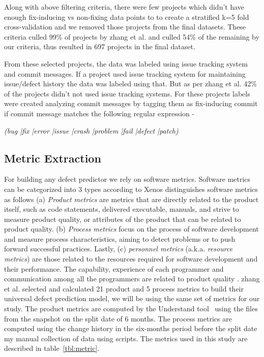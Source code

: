 \documentclass[sigconf]{acmart}
\theoremstyle{break}
\begin{document}
Along with above filtering criteria, there were few projects which didn't have enough fix-inducing vs non-fixing data points to to create a stratified k=5 fold cross-validation and we removed those projects from the final datasets. These criteria culled 99\% of projects by zhang et al. and culled 54\% of the remaining by our criteria, thus resulted in 697 projects in the final dataset.

From these selected projects, the data was labeled using issue tracking system and commit messages. If a project used issue tracking system for maintaining issue/defect history the data was labeled using that. But as per zhang et al. 42\% of the projects didn't not used issue tracking systems. For these projects labels were created analyzing commit messages by tagging them as fix-inducing commit if commit message matches the following regular expression - 

\begin{center}
\textit{(bug |fix |error |issue |crash |problem |fail |defect |patch)}
\end{center}
 

\subsection{Metric Extraction}
\label{sec:Metric Extraction}

For building any defect predictor we rely on software metrics. Software metrics can be categorized into 3 types according to Xenos \cite{Xenos} distinguishes software metrics as  follows (a) {\em Product metrics} are metrics that are directly related to the product itself, such as code statements, delivered executable, manuals, and strive to measure product quality, or attributes of the product that can be related to product quality. (b) {\em Process metrics} focus on the process of software development and measure process characteristics, aiming to detect problems or to push forward successful practices. Lastly, (c) {\em personnel metrics} (a.k.a. {\em resource metrics}) are those related to the resources required for software development and their performance. The capability, experience of each programmer and communication among all the programmers are related to product quality \cite{wolf2009predicting,de2004sometimes,cataldo2013coordination,cataldo2007coordination}. zhang et al. selected and calculated 21 product and 5 process metrics to build their universal defect prediction model, we will be using the same set of metrics for our study. The product metrics are computed by the Understand tool~\cite{visualize} using the files from the snapshot on the split date of 6 months. The process metrics are computed using the change history in the six-months period before the split date my manual collection of data using scripts. The metrics used in this study are described in table~\ref{tbl:metric}.
\end{document}
